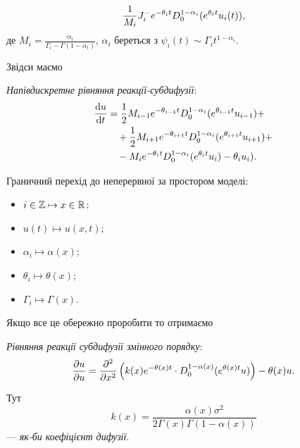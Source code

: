 
\begin{equation}
    \frac{1}{M_i} J_i^- e^{-\theta_i t} D_0^{1 - \alpha_i}(e^{\theta_t t} u_i(t)),
\end{equation}
де $M_i = \frac{\alpha_i}{\Gamma_i - \Gamma(1 - \alpha_i)}$, $\alpha_i$ береться з $\psi_i(t) \sim \Gamma_i t^{1 - \alpha_i}$. \medskip

Звідси маємо 
\begin{definition}
    \textit{Напівдискретне рівняння реакції-субдифузії}:
    \begin{equation}
        \begin{aligned}
            \frac{\mathop{}\!\mathrm{d} u}{\mathop{}\!\mathrm{d} t}
            &= \frac{1}{2} M_{i - 1} e^{-\theta_{i - 1} t} D_0^{1 - \alpha_i} (e^{\theta_{i - 1} t} u_{i - 1}) + \\
            &\quad + \frac{1}{2} M_{i + 1} e^{-\theta_{i + 1} t} D_0^{1 - \alpha_i} (e^{\theta_{i + 1} t} u_{i + 1}) + \\
            &\quad - M_i e^{-\theta_i t} D_0^{1 - \alpha_i}(e^{\theta_i t} u_i) - \theta_i u_i).
        \end{aligned}
    \end{equation}
\end{definition}

Граничний перехід до неперервної за простором моделі:
\begin{itemize}
    \item $i \in \mathbb{Z} \mapsto x \in \mathbb{R}$;
    \item $u(t) \mapsto u(x, t)$;
    \item $\alpha_i \mapsto \alpha(x)$;
    \item $\theta_i \mapsto \theta(x)$;
    \item $\Gamma_i \mapsto \Gamma(x)$.
\end{itemize}

Якщо все це обережно проробити то отримаємо
\begin{definition}
    \textit{Рівняння реакції субдифузії змінного порядку}:
    \begin{equation}
        \label{eq:starstar}
        \frac{\partial u}{\partial u} = \frac{\partial^2}{\partial x^2} \left( k(x) e^{-\theta(x) t} \cdot D_0^{1 - \alpha(x)}( e^{\theta(x) t} u ) \right) - \theta(x) u.
    \end{equation}
    
    Тут 
    \begin{equation}
        k(x) = \frac{\alpha(x) \sigma^2}{2 \Gamma(x) \Gamma(1 - \alpha(x))}
    \end{equation}
    --- \textit{як-би коефіцієнт дифузії}.
\end{definition}

